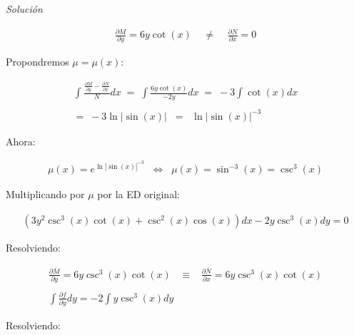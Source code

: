 \textit{Solución}

\begin{equation*}
    \begin{gathered}
        \frac{\partial{M}}{\partial{y}}=6y\cot(x)\;\;\;\;\neq\;\;\;\;\frac{\partial{N}}{\partial{x}}=0
    \end{gathered}
\end{equation*}

Propondremos \(\displaystyle\mu=\mu(x)\):

\begin{equation*}
    \begin{gathered}
        \int\frac{\frac{\partial{M}}{\partial{y}}-\frac{\partial{N}}{\partial{x}}}{N}dx\;=\;\int\frac{6y\cot(x)}{-2y}dx\;=\;-3\int\cot(x)dx\\\\
        =\;-3\ln|\sin(x)|\;\;=\;\;\ln\left|\sin(x)\right|^{-3}
    \end{gathered}
\end{equation*}

Ahora:

\begin{equation*}
    \begin{gathered}
        \mu(x)=e^{\ln\left|\sin(x)\right|^{-3}}\;\;\Leftrightarrow\;\;\mu(x)=\sin^{-3}(x)=\csc^{3}(x)
    \end{gathered}
\end{equation*}

Multiplicando por \(\displaystyle\mu\) por la ED original:

\begin{equation*}
    \begin{gathered}
        \left(3y^{2}\csc^{3}(x)\cot(x)+\csc^{2}(x)\cos(x)\right)dx-2y\csc^{3}(x)dy=0
    \end{gathered}
\end{equation*}

Resolviendo:

\begin{equation*}
    \begin{gathered}
        \frac{\partial{\bar{M}}}{\partial{y}}=6y\csc^{3}(x)\cot(x)\;\;\;\equiv\;\;\;\frac{\partial{\bar{N}}}{\partial{x}}=6y\csc^{3}(x)\cot(x)\\\\
        \int\frac{\partial{f}}{\partial{y}}dy=-2\int y\csc^{3}(x)dy
    \end{gathered}
\end{equation*}

Resolviendo:

